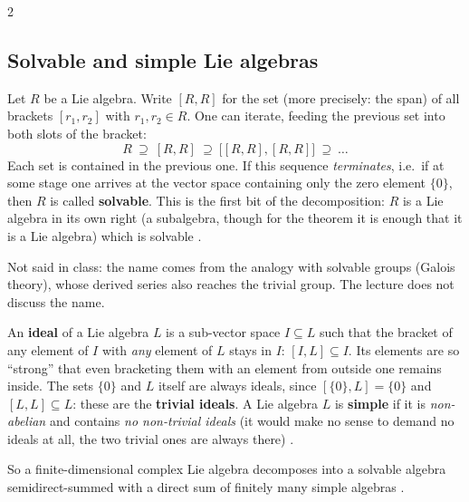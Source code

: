 \begin{paracol}{2}
\subsection{Solvable and simple Lie algebras}\label{sec:cl-solvable}
\begin{definition}\label{def:cl-solvable}
Let $R$ be a Lie algebra. Write $[R,R]$ for the set (more precisely: the span) of all brackets $[r_1,r_2]$ with $r_1,r_2\in R$. One can iterate, feeding the previous set into both slots of the bracket:
\[
  R\ \supseteq\ [R,R]\ \supseteq\ \bigl[[R,R],[R,R]\bigr]\ \supseteq\ \dots
\]
Each set is contained in the previous one. If this sequence \emph{terminates}, i.e.\ if at some stage one arrives at the vector space containing only the zero element $\{0\}$, then $R$ is called \textbf{solvable}. This is the first bit of the decomposition: $R$ is a Lie algebra in its own right (a subalgebra, though for the theorem it is enough that it is a Lie algebra) which is solvable       .
\end{definition}
\begin{coursenote}
Not said in class: the name comes from the analogy with solvable groups (Galois theory), whose derived series also reaches the trivial group. The lecture does not discuss the name. 
\end{coursenote}

\begin{definition}\label{def:cl-simple}
An \textbf{ideal} of a Lie algebra $L$ is a sub-vector space $I\subseteq L$ such that the bracket of any element of $I$ with \emph{any} element of $L$ stays in $I$: $[I,L]\subseteq I$. Its elements are so ``strong'' that even bracketing them with an element from outside one remains inside. The sets $\{0\}$ and $L$ itself are always ideals, since $[\{0\},L]=\{0\}$ and $[L,L]\subseteq L$: these are the \textbf{trivial ideals}. A Lie algebra $L$ is \textbf{simple} if it is \emph{non-abelian} and contains \emph{no non-trivial ideals} (it would make no sense to demand no ideals at all, the two trivial ones are always there)           .
\end{definition}
So a finite-dimensional complex Lie algebra decomposes into a solvable algebra semidirect-summed with a direct sum of finitely many simple algebras .


\end{paracol}
